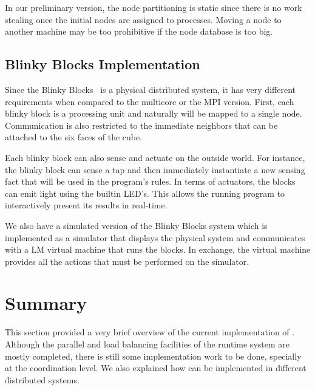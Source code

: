 In our preliminary version, the node partitioning is static since there is no work stealing once the initial nodes are assigned to processes.
Moving a node to another machine may be too prohibitive if the node database is too big.
 
\subsection{Blinky Blocks Implementation}

Since the Blinky Blocks~\cite{Kirby-chi11} is a physical distributed system, it has very different requirements when compared to the multicore
or the MPI version. First, each blinky block is a processing unit and naturally will be mapped to a single node. Communication is also restricted
to the immediate neighbors that can be attached to the six faces of the cube.

Each blinky block can also sense and actuate on the outside world. For instance, the blinky block can sense a tap and then immediately instantiate
a new sensing fact that will be used in the program's rules. In terms of actuators, the blocks can emit light using the builtin LED's.
This allows the running program to interactively present its results in real-time.

We also have a simulated version of the Blinky Blocks system which is implemented as a simulator that displays the physical system and
communicates with a LM virtual machine that runs the blocks. In exchange, the virtual machine provides all the actions that must be performed
on the simulator.

\section{Summary}

This section provided a very brief overview of the current implementation of \lang. Although the parallel and load balancing facilities of the
runtime system are mostly completed, there is still some implementation work to be done, specially at the coordination level.
We also explained how \lang can be implemented in different distributed systems.
